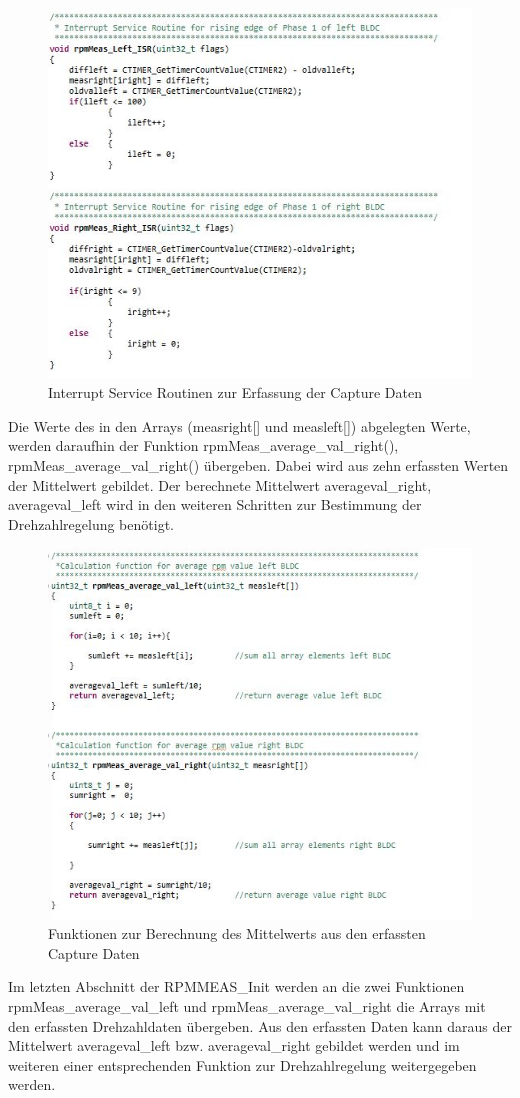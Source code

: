 \begin{figure}[H] %
\includegraphics[width=.62\textwidth]{sec4/images/isr} 
\centering
\captionsetup{width=.95\textwidth}
\caption[isr]{Interrupt Service Routinen zur Erfassung der Capture Daten }\centering
\label{fig:isr}
\end{figure}

Die Werte des in den Arrays (\glqq{}measright[]\grqq{} und \glqq{}measleft[]\grqq{}) abgelegten Werte, werden daraufhin der Funktion \glqq{}rpmMeas\_average\_val\_right()\grqq{}, \glqq{}rpmMeas\_average\_val\_right()\grqq{} übergeben. Dabei wird aus zehn erfassten Werten der Mittelwert gebildet. Der berechnete Mittelwert \glqq{}averageval\_right\grqq{}, \glqq{}averageval\_left\grqq{} wird in den weiteren Schritten zur Bestimmung der Drehzahlregelung benötigt. 


\begin{figure}[H] %
\includegraphics[width=.62\textwidth]{sec4/images/calculation} 
\centering
\captionsetup{width=.95\textwidth}
\caption[calculation]{Funktionen zur Berechnung des Mittelwerts aus den erfassten Capture Daten }\centering
\label{fig:calculation}
\end{figure}

Im letzten Abschnitt der RPMMEAS\_Init werden an die zwei Funktionen \glqq{}rpmMeas\_average\_val\_left\grqq{} und \glqq{}rpmMeas\_average\_val\_right\grqq{} die Arrays mit den erfassten Drehzahldaten übergeben. Aus den erfassten Daten kann daraus der Mittelwert \glqq{}averageval\_left\grqq{} bzw. \glqq{}averageval\_right\grqq{} gebildet werden und im weiteren einer entsprechenden Funktion zur Drehzahlregelung weitergegeben werden.


\newpage